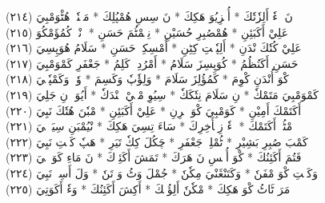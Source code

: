 \documentclass[a4paper, 10pt]{report}
\begin{document}
\begin{center}
\textarabic{(٢١٤) \textcolor{mygreen}{نَ زٖءٗ أَلِزٗتٗكَ  * أُمٖزِيُوَ هَكِكَ  * نَ سِسِ هُمْپُلِكَ  * مَنٖنٗيٖ هُٹْوَمْبِيَ }} 
\\[5mm] 

\textarabic{(٢١٥) \textcolor{mygreen}{عَلِيْ أَكَبَئِنِ  * هُمْصُبِرِ حُسَيْنِ  * نِمٖمْٹُمَ حَسَنِ  * إٖنْدٖ كُمُؤَمْكُوَ }} 
\\[5mm] 

\textarabic{(٢١٦) \textcolor{mygreen}{عَلِيْ كُتٗكَ نْدَنِ  * أَلِپٗكٖتِ كِٹِنِ  * أَمْسِكِيٖ حَسَنِ  * سَلَامُ هُوَپِسِيَ }} 
\\[5mm] 

\textarabic{(٢١٧) \textcolor{mygreen}{حَسَنِ أَكَنُظُمُ  * كُوَپِسِزَ سَلَامُ  * أَمْرُدِشٖ كَلِمُ  * جَعْفَرِ كَمْوَمْبِيَ }} 
\\[5mm] 

\textarabic{(٢١٨) \textcolor{mygreen}{كْوَ أُنْدَنِ كْوِمَ  * كَمُؤُلِزَ سَلَامَ  * وَلِؤٗپٗ وَكَسِمَ  * وٗتٖ وَكَمْپٗكٖيَ }} 
\\[5mm] 

\textarabic{(٢١٩) \textcolor{mygreen}{كَمْوَمْبِيَ مَتَمْكٗ  * نِ سَلَامَ نِتٗكَكٗ  * سِيُوِ مْبٖيْ نٖنْدَكٗ  * أَيُوَءٖ نِ جَلِيَ }} 
\\[5mm] 

\textarabic{(٢٢٠) \textcolor{mygreen}{أَكَتَمْكَ أَمِيْنِ  * كَوَمْبِيَ كْوَ هٖرِنِ  * عَلِيْ أَكَبَئِنِ  * مْبٗنَ هُتٗكَ نَبِيَ }} 
\\[5mm] 

\textarabic{(٢٢١) \textcolor{mygreen}{مْٹُمٖ أَكَتَمْكَ  * زٖءٗ زِمٖأَخِرِكَ  * سَاءَ تِسِيَ هَكِكَ  * نْيُمْبَنِ سِيَرٖجٖيَ }} 
\\[5mm] 

\textarabic{(٢٢٢) \textcolor{mygreen}{كَمْبَ صُبِرِ بَشِيْرِ  * ٹُمْلِشٖ جَعْفَرِ  * چَكُلَ كِكٗ تَيَرِ  * هَپٗ كَكٖتِ نَبِيَ }} 
\\[5mm] 

\textarabic{(٢٢٣) \textcolor{mygreen}{فَتُمَ أَكَئِنُكَ  * كْوَ أُپٖسِ نَ هَرَكَ  * تَمَشَ أَكَئِوٖكَ  * نَ مَاءِ كَوَپٖكٖيَ }} 
\\[5mm] 

\textarabic{(٢٢٤) \textcolor{mygreen}{وَكَكٖتِ كْوَ مْفَنٗ  * وَكَتَنْڠَنْيَ مِكٗنٗ  * جُمْلَ وَٹُ وَ تَنٗ  * وَلَ أَسِلٖ نَبِيَ }} 
\\[5mm] 

\textarabic{(٢٢٥) \textcolor{mygreen}{مَرَ ٹَاٹُ كْوَ هَكِكَ  * مْكٗنٗ أَلِؤُپٖكَ  * أَكِشَ أَكَئِنُكَ  * وَءٗ أَكَوَتِيَ }} 
\\[5mm] 


\end{center}
\end{document}
